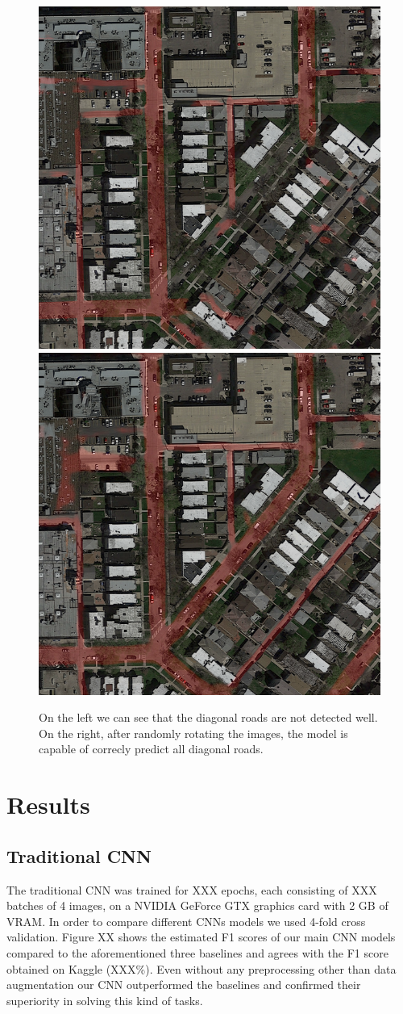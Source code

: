\documentclass[10pt,conference,compsocconf]{IEEEtran}
\begin{document}
\begin{figure}[h]
 \centering
 \includegraphics[width=0.35\columnwidth]{img/diagonals.png}
 \includegraphics[width=0.35\columnwidth]{img/diagonals_corrected.png}
 \caption{On the left we can see that the diagonal roads are not detected well. On the right, after randomly rotating the images, the model is capable of correcly predict all diagonal roads.}
 \vspace{-3mm}
 \label{fig:diagonal}
\end{figure}

\section{Results}
\label{sec:results}
\subsection{Traditional CNN}
	The traditional CNN was trained for XXX epochs, each consisting of XXX batches of 4 images, on a NVIDIA GeForce GTX graphics card with 2 GB of VRAM.
	In order to compare different CNNs models we used 4-fold cross validation. Figure XX shows the estimated F1 scores of our main CNN models compared to the aforementioned three baselines and agrees with the F1 score obtained on Kaggle (XXX\%). Even without any preprocessing other than data augmentation our CNN outperformed the baselines and confirmed their superiority in solving this kind of tasks.
\end{document}
